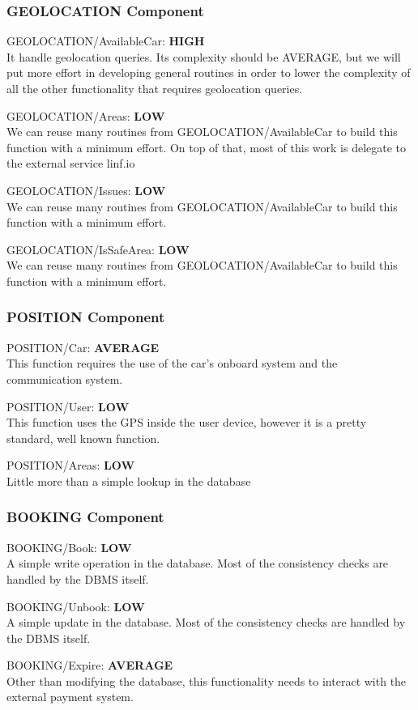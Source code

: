 \documentclass[11pt]{article} %
\newcommand{\extInput}[3]{ #1:  \textbf{#2} \\ #3  }
\begin{document}
\subsubsection{GEOLOCATION Component}

\begin{description}
	\item \extInput
		{GEOLOCATION/AvailableCar}
		{HIGH}
		{It handle geolocation queries. Its complexity should be AVERAGE, but we will put more effort in developing general routines in order to lower the complexity of all the other functionality that requires geolocation queries.}
	\item \extInput
		{GEOLOCATION/Areas}
		{LOW}
		{We can reuse many routines from GEOLOCATION/AvailableCar to build this function with a minimum effort. On top of that, most of this work is delegate to the external service linf.io}
	\item \extInput
		{GEOLOCATION/Issues}
		{LOW}
		{We can reuse many routines from GEOLOCATION/AvailableCar to build this function with a minimum effort.}
	\item \extInput
		{GEOLOCATION/IsSafeArea}
		{LOW}
		{We can reuse many routines from GEOLOCATION/AvailableCar to build this function with a minimum effort.}

\end{description}

\subsubsection{POSITION Component}

\begin{description}
	\item \extInput
		{POSITION/Car}
		{AVERAGE}
		{This function requires the use of the car's onboard system and the communication system.}
	\item \extInput
		{POSITION/User}
		{LOW}
		{This function uses the GPS inside the user device, however it is a pretty standard, well known function.}
	\item \extInput
		{POSITION/Areas}
		{LOW}
		{Little more than a simple lookup in the database}
\end{description}

\subsubsection{BOOKING Component}

\begin{description}
	\item \extInput
		{BOOKING/Book}
		{LOW}
		{A simple write operation in the database. Most of the consistency checks are handled by the DBMS itself.}
	\item \extInput
		{BOOKING/Unbook}
		{LOW}
		{A simple update in the database. Most of the consistency checks are handled by the DBMS itself.}
	\item \extInput
		{BOOKING/Expire}
		{AVERAGE}
		{Other than modifying the database, this functionality needs to interact with the external payment system.}
\end{description}
\end{document}
